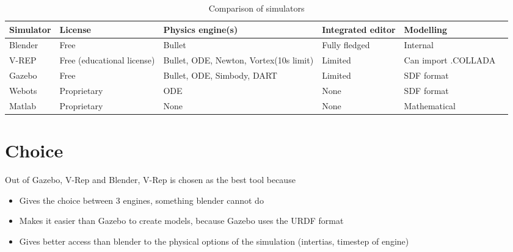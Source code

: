 \begin{table}[htp]
\center
\begin{tabularx}{\textwidth}{@{} l l X X X X @{}}
\toprule
\textbf{Simulator} & \textbf{License} & \textbf{Physics engine(s)} & \textbf{Integrated editor} & \textbf{Modelling}\\ 
\midrule
Blender & Free & Bullet & Fully fledged & Internal\\ 

V-REP & Free (educational license) & Bullet, ODE, Newton, Vortex(10s limit) & Limited & Can import .COLLADA\\

Gazebo & Free & Bullet, ODE, Simbody, DART & Limited & SDF format\\

Webots & Proprietary & ODE & None & SDF format\\

Matlab & Proprietary & None & None & Mathematical\\
\bottomrule
\end{tabularx}
\caption{Comparison of simulators }
\label{table:simulators_comp}
\end{table}

\section{Choice}
Out of Gazebo, V-Rep and Blender, V-Rep is chosen as the best tool because\begin{itemize}
\item Gives the choice between 3 engines, something blender cannot do
\item Makes it easier than Gazebo to create models, because Gazebo uses the URDF format
\item Gives better access than blender to the physical options of the simulation (intertias, timestep of engine)
\end{itemize}
